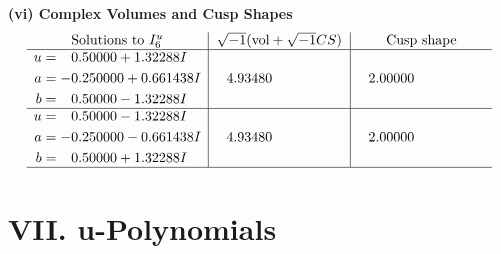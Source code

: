 \documentclass[1p]{elsarticle_modified}
\theoremstyle{definition}
\newcommand{\I}{\sqrt{-1}}
\begin{document}
\newpage\flushleft \textbf{(vi) Complex Volumes and Cusp Shapes}
$$\begin{array}{c|c|c}  
\text{Solutions to }I^u_{6}& \I (\text{vol} + \sqrt{-1}CS) & \text{Cusp shape}\\
 \hline 
\begin{aligned}
u &= \phantom{-}0.50000 + 1.32288 I \\
a &= -0.250000 + 0.661438 I \\
b &= \phantom{-}0.50000 - 1.32288 I\end{aligned}
 & \phantom{-}4.93480\phantom{ +0.000000I} & \phantom{-}2.00000\phantom{ +0.000000I} \\ \hline\begin{aligned}
u &= \phantom{-}0.50000 - 1.32288 I \\
a &= -0.250000 - 0.661438 I \\
b &= \phantom{-}0.50000 + 1.32288 I\end{aligned}
 & \phantom{-}4.93480\phantom{ +0.000000I} & \phantom{-}2.00000\phantom{ +0.000000I}\\
 \hline 
 \end{array}$$\newpage
\newpage\renewcommand{\arraystretch}{1}
\centering \section*{ VII. u-Polynomials}
\end{document}
